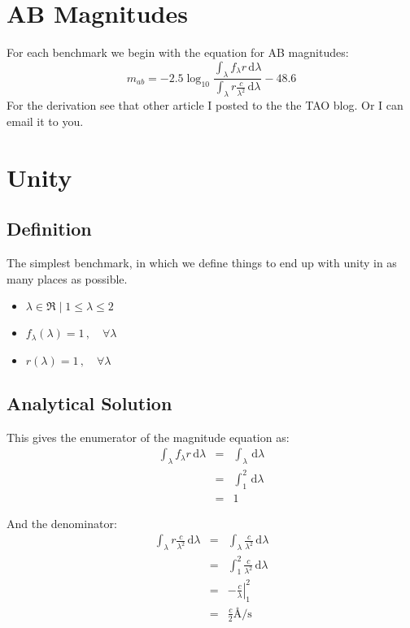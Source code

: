 \documentclass[12pt]{scrartcl}
\newcommand{\dx}[1]{\ensuremath{\,\mathrm{d}#1}}
\begin{document}
\maketitle

\section{AB Magnitudes}

For each benchmark we begin with the equation for AB magnitudes:
\[ m_{ab} = -2.5\log_{10} \frac{{\displaystyle \int_\lambda f_\lambda
    r \dx{\lambda}}}{{\displaystyle \int_\lambda r \frac{c}{\lambda^2}
    \dx{\lambda}}} - 48.6 \]
For the derivation see that other article I posted to the the TAO
blog. Or I can email it to you.

\section{Unity}

\subsection{Definition}

The simplest benchmark, in which we define things to end up with unity
in as many places as possible.

\begin{itemize}
  \item ${\lambda \in \Re \mid 1 \leq \lambda \le 2}$
  \item $f_\lambda(\lambda) = 1 \, , \quad \forall \lambda$
  \item $r(\lambda) = 1 \, , \quad \forall \lambda$
\end{itemize}

\subsection{Analytical Solution}

This gives the enumerator of the magnitude equation as:
\begin{eqnarray*}
\int_\lambda f_\lambda r \dx{\lambda} & = & \int_\lambda \dx{\lambda}
\\
& = & \int_1^2 \dx{\lambda} \\
& = & 1
\end{eqnarray*}

And the denominator:
\begin{eqnarray*}
\int_\lambda r \frac{c}{\lambda^2} \dx{\lambda} & = & \int_\lambda
\frac{c}{\lambda^2} \dx{\lambda} \\
&= & \int_1^2 \frac{c}{\lambda^2} \dx{\lambda} \\
&= & \left. -\frac{c}{\lambda} \right|_1^2 \\
& = & \frac{c}{2} \si{\angstrom\per\second}
\end{eqnarray*}
\end{document}
